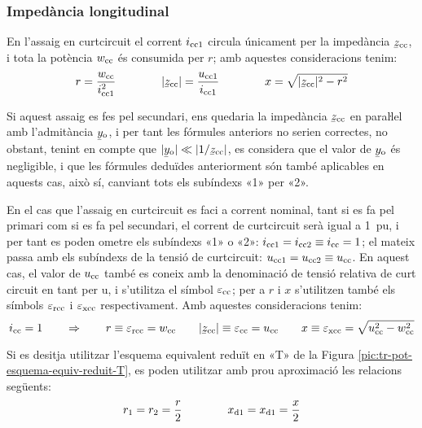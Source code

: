 \subsubsection{Impedància longitudinal}

En l'assaig en curtcircuit el corrent $i_\mathrm{cc1}$ circula
únicament per la impedància $\cmplx{z}\ped{cc}$, i tota la potència
$w_\mathrm{cc}$ és consumida per $r$; amb aquestes consideracions tenim:
\begin{equation}
    r = \frac{w\ped{cc}}{i\ped{cc1}^2} \qquad\qquad
    |\cmplx{z}\ped{cc}| = \frac{u\ped{cc1}}{i\ped{cc1}} \qquad\qquad
    x = \sqrt{|\cmplx{z}\ped{cc}|^2 - r^2}
\end{equation}

Si aquest assaig es fes pel secundari, ens quedaria la impedància
$\cmplx{z}\ped{cc}$ en paraŀlel amb l'admitància
$\cmplx{y}\ped{o}$, i per tant les fórmules anteriors no serien
correctes, no obstant, tenint en compte que $|\cmplx{y}\ped{o}| \ll
|1/\cmplx{z}\ped{cc}|$, es considera que el valor de
$\cmplx{y}\ped{o}$ és negligible, i que les fórmules deduïdes
anteriorment són també aplicables en aquests cas, això sí, canviant
tots els subíndexs «1» per «2».

En el cas que l'assaig en curtcircuit es faci a corrent nominal,
tant  si es fa pel primari  com si es fa pel secundari, el corrent
de curtcircuit serà igual a \SI{1}{pu}, i per tant es poden ometre els
subíndexs «1» o «2»: $i_\mathrm{cc1} = i_\mathrm{cc2} \equiv i_\mathrm{cc} = 1$;
el mateix passa amb els subíndexs de la tensió de curtcircuit:
$u_\mathrm{cc1} = u_\mathrm{cc2} \equiv u_\mathrm{cc}$. En aquest cas, el valor
de $u_\mathrm{cc}$ també es coneix amb la denominació de
tensió relativa de curt  circuit en tant per u, i s'utilitza  el
símbol $\varepsilon_\mathrm{cc}$; per a $r$ i $x$ s'utilitzen també els
símbols $\varepsilon_\mathrm{rcc}$ i $\varepsilon_\mathrm{xcc}$
respectivament. Amb aquestes consideracions tenim:
\begin{equation}
    i\ped{cc} = 1 \qquad \Rightarrow \qquad r \equiv \varepsilon\ped{rcc} = w\ped{cc} \qquad
    |\cmplx{z}\ped{cc}| \equiv \varepsilon\ped{cc} = u\ped{cc} \qquad
    x \equiv \varepsilon\ped{xcc} = \sqrt{u\ped{cc}^2 - w\ped{cc}^2}
    \label{eq:assaig-cc-nomianl}
\end{equation}

Si es desitja utilitzar l'esquema equivalent reduït en «T» de la Figura \vref{pic:tr-pot-esquema-equiv-reduit-T}, es poden utilitzar amb prou aproximació les relacions següents:
\begin{equation}
    r_1 = r_2 = \frac{r}{2} \qquad\qquad x_\mathrm{d1} = x_\mathrm{d1} = \frac{x}{2}
\end{equation}


